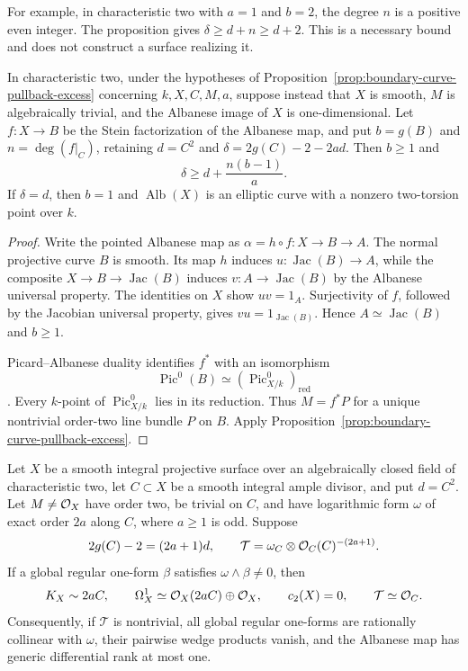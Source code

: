 For example, in characteristic two with $a=1$ and $b=2$,
the degree $n$ is a positive even integer. The proposition gives
$\delta\geq d+n\geq d+2$. This is a necessary bound and does
not construct a surface realizing it.

\begin{corollary}
\label{cor:boundary-albanese-curve}
In characteristic two, under the hypotheses of
Proposition~\ref{prop:boundary-curve-pullback-excess} concerning
$k,X,C,M,a$, suppose instead that $X$ is smooth, $M$ is algebraically
trivial, and the Albanese image of $X$ is one-dimensional.  Let
$f:X\to B$ be the Stein factorization of the Albanese map, and put
$b=g(B)$ and $n=\deg(f|_C)$, retaining
$d=C^2$ and $\delta=2g(C)-2-2ad$.  Then $b\geq1$ and
\[
 \delta\geq d+\frac{n(b-1)}a.
\]
If $\delta=d$, then $b=1$ and $\operatorname{Alb}(X)$ is an elliptic
curve with a nonzero two-torsion point over $k$.
\end{corollary}

\begin{proof}
Write the pointed Albanese map as $\alpha=h\circ f:X\to B\to A$.
The normal projective curve $B$ is smooth.  Its map $h$ induces
$u:\operatorname{Jac}(B)\to A$, while the composite
$X\to B\to\operatorname{Jac}(B)$ induces
$v:A\to\operatorname{Jac}(B)$ by the Albanese universal property.
The identities on $X$ show $uv=1_A$.  Surjectivity of $f$, followed
by the Jacobian universal property, gives $vu=1_{\operatorname{Jac}(B)}$.
Hence $A\simeq\operatorname{Jac}(B)$ and $b\geq1$.

Picard--Albanese duality identifies $f^*$ with an isomorphism
\[
 \operatorname{Pic}^0(B)\simeq
       (\operatorname{Pic}^0_{X/k})_{\mathrm{red}}
\]
\cite[Expos\'e~236, Corollary~3.2 and Theorem~3.3(iii),
pp.~236--238]{FGAPicard}.
Every $k$-point of $\operatorname{Pic}^0_{X/k}$ lies in its reduction.
Thus $M=f^*P$ for a unique nontrivial order-two line bundle $P$ on
$B$.  Apply Proposition~\ref{prop:boundary-curve-pullback-excess}.
\end{proof}

\begin{proposition}
\label{prop:boundary-ample-wedge}
Let $X$ be a smooth integral projective surface over an algebraically
closed field of characteristic two, let $C\subset X$ be a smooth
integral ample divisor, and put $d=C^2$.  Let $M\ne\OO_X$ have
order two, be trivial on $C$, and have logarithmic form $\omega$ of
exact order $2a$ along $C$, where $a\geq1$ is odd.  Suppose
\[
 2g(C)-2=(2a+1)d,
 \qquad
 \mathcal T=\omega_C\otimes\OO_C(C)^{-(2a+1)}.
\]
If a global regular one-form $\beta$ satisfies $\omega\wedge\beta\ne0$,
then
\begin{equation}\label{eq:boundary-ample-wedge-splitting}
 K_X\sim2aC,\qquad
 \Omega_X^1\simeq\OO_X(2aC)\oplus\OO_X,\qquad
 c_2(X)=0,\qquad\mathcal T\simeq\OO_C.
\end{equation}
Consequently, if $\mathcal T$ is nontrivial, all global regular
one-forms are rationally collinear with $\omega$, their pairwise
wedge products vanish, and the Albanese map has generic differential
rank at most one.
\end{proposition}

